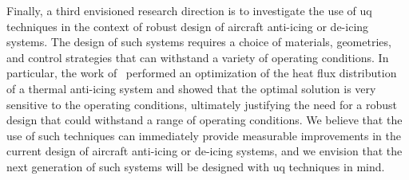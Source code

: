 \smallskip
Finally, a third envisioned research direction is to investigate the use of \gls{uq} techniques in the context of robust design of aircraft anti-icing or de-icing systems. The design of such systems requires a choice of materials, geometries, and control strategies that can withstand a variety of operating conditions. In particular, the work of~\cite{GoriGallia2024} performed an optimization of the heat flux distribution of a thermal anti-icing system and showed that the optimal solution is very sensitive to the operating conditions, ultimately justifying the need for a robust design that could withstand a range of operating conditions. We believe that the use of such techniques can immediately provide measurable improvements in the current design of aircraft anti-icing or de-icing systems, and we envision that the next generation of such systems will be designed with \gls{uq} techniques in mind.